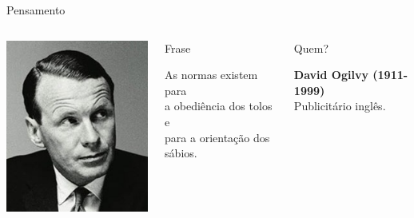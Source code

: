\documentclass[xcolor=dvipsnames,table]{beamer}
\begin{document}
	\begin{frame}{Pensamento}
		\begin{columns}
		  		\begin{center}
		    		\includegraphics[height=.5\textheight]{images/ogilvy.jpg}
		  		\end{center}
				\begin{block}{Frase}
					\begin{center}
						{\large As normas existem para \\a obediência dos tolos e \\ para a orientação dos sábios.}
					\end{center}
				\end{block}		  		
		  		\begin{block}{Quem?}
		  			\begin{center}
						{\bf David Ogilvy (1911-1999)} \\Publicitário inglês.
					\end{center}
				\end{block}
		\end{columns}
	\end{frame}   
    
\end{document}
